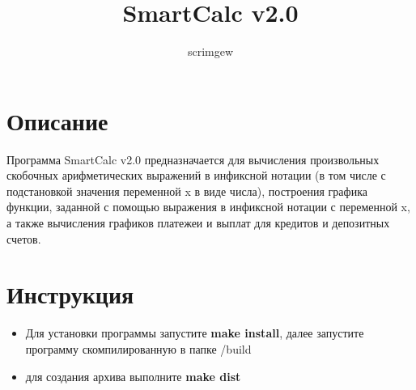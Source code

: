 \documentclass{article}
\title{SmartCalc v2.0}
\author{scrimgew}
\begin{document}
\maketitle
\section{Описание}
Программа SmartCalc v2.0 предназначается для вычисления произвольных скобочных арифметических выражений в инфиксной нотации (в том числе с подстановкой значения переменной x в виде числа), построения графика функции, заданной с помощью выражения в инфиксной нотации с переменной x, а также вычисления графиков платежеи и выплат для кредитов и депозитных счетов.

\section{Инструкция}
\begin{itemize}
\item Для установки программы запустите \textbf{make install}, далее запустите программу скомпилированную в папке /build
\item для создания архива выполните \textbf{make dist}
\end{itemize}
\end{document}
